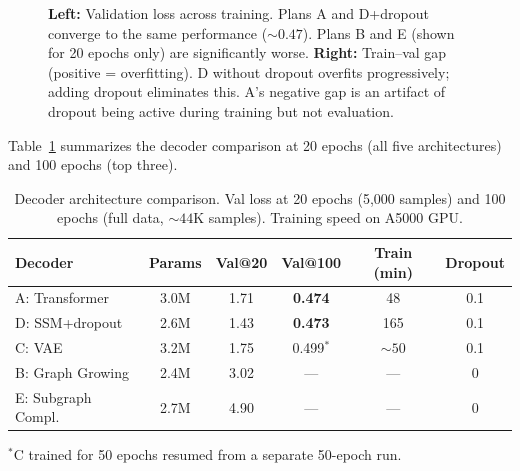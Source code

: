 \documentclass{article}
\begin{document}
\begin{figure}[t]
\caption{\textbf{Left:} Validation loss across training. Plans A and D+dropout
converge to the same performance (${\sim}0.47$). Plans B and E (shown for 20 epochs
only) are significantly worse. \textbf{Right:} Train--val gap (positive = overfitting).
D without dropout overfits progressively; adding dropout eliminates this. A's negative
gap is an artifact of dropout being active during training but not evaluation.}
\label{fig:training}
\end{figure}

Table~\ref{tab:comparison} summarizes the decoder comparison at 20 epochs (all five
architectures) and 100 epochs (top three).

\begin{table}[t]
\centering
\caption{Decoder architecture comparison. Val loss at 20 epochs (5,000 samples)
and 100 epochs (full data, ${\sim}44$K samples). Training speed on A5000 GPU.}
\label{tab:comparison}
\begin{tabular}{lccccc}
\toprule
\textbf{Decoder} & \textbf{Params} & \textbf{Val@20} & \textbf{Val@100} & \textbf{Train (min)} & \textbf{Dropout} \\
\midrule
A: Transformer & 3.0M & 1.71 & \textbf{0.474} & 48 & 0.1 \\
D: SSM+dropout & 2.6M & 1.43 & \textbf{0.473} & 165 & 0.1 \\
C: VAE & 3.2M & 1.75 & 0.499$^*$ & ${\sim}50$ & 0.1 \\
B: Graph Growing & 2.4M & 3.02 & --- & --- & 0 \\
E: Subgraph Compl. & 2.7M & 4.90 & --- & --- & 0 \\
\bottomrule
\end{tabular}
\begin{flushleft}
\scriptsize $^*$C trained for 50 epochs resumed from a separate 50-epoch run.
\end{flushleft}
\end{table}
\end{document}
